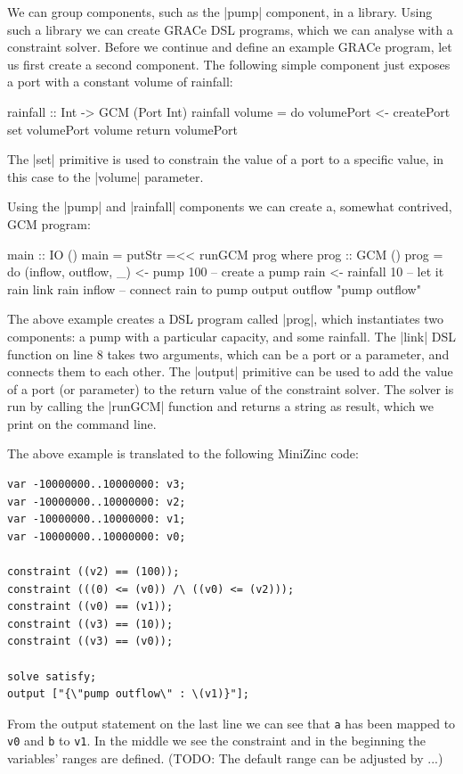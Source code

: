 \documentclass{article}
\begin{document}
We can group components, such as the |pump| component, in a library. Using such
a library we can create GRACe DSL programs, which we can analyse with a
constraint solver. Before we continue and define an example GRACe program, let
us first create a second component. The following simple component just exposes
a port with a constant volume of rainfall:
\begin{haskellcode}
rainfall :: Int -> GCM (Port Int)
rainfall volume = do
  volumePort <- createPort
  set volumePort volume
  return volumePort
\end{haskellcode}
The |set| primitive is used to constrain the value of a port to a specific value,
in this case to the |volume| parameter. 

Using the |pump| and |rainfall| components we can create a, somewhat contrived,
\ac{GCM} program:
\begin{haskellcode}
main :: IO ()
main = putStr =<< runGCM prog
  where
    prog :: GCM ()
    prog = do
      (inflow, outflow, _) <- pump 100  -- create a pump
      rain <- rainfall 10               -- let it rain
      link rain inflow                  -- connect rain to pump
      output outflow "pump outflow"
\end{haskellcode}
The above example creates a DSL program called |prog|, which instantiates two
components: a pump with a particular capacity, and some rainfall. The |link| DSL
function on line 8 takes two arguments, which can be a port or a parameter, and
connects them to each other. The |output| primitive can be used to add the value
of a port (or parameter) to the return value of the constraint solver. The
solver is run by calling the |runGCM| function and returns a string as result,
which we print on the command line.

The above example is translated to the following MiniZinc code:
%
\begin{verbatim}
var -10000000..10000000: v3;
var -10000000..10000000: v2;
var -10000000..10000000: v1;
var -10000000..10000000: v0;

constraint ((v2) == (100));
constraint (((0) <= (v0)) /\ ((v0) <= (v2)));
constraint ((v0) == (v1));
constraint ((v3) == (10));
constraint ((v3) == (v0));

solve satisfy;
output ["{\"pump outflow\" : \(v1)}"];
\end{verbatim}
%
From the output statement on the last line we can see that \texttt{a} has
been mapped to \texttt{v0} and \texttt{b} to \texttt{v1}.
%
In the middle we see the constraint and in the beginning the
variables' ranges are defined.
%
(TODO: The default range can be adjusted by ...)
\end{document}
